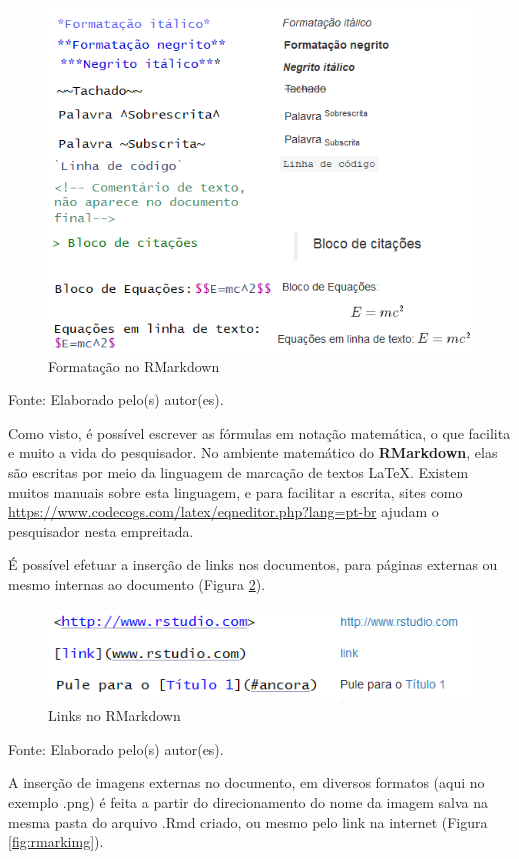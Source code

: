 \documentclass[12pt,brazil,]{book}
\begin{document}
\begin{figure}

{\centering \includegraphics[width=0.6\linewidth]{rmarkform} 

}

\caption{Formatação no RMarkdown}\label{fig:rmarkform}
\end{figure}

Fonte: Elaborado pelo(s) autor(es).

Como visto, é possível escrever as fórmulas em notação matemática, o que
facilita e muito a vida do pesquisador. No ambiente matemático do
\textbf{RMarkdown}, elas são escritas por meio da linguagem de marcação
de textos LaTeX. Existem muitos manuais sobre esta linguagem, e para
facilitar a escrita, sites como
\url{https://www.codecogs.com/latex/eqneditor.php?lang=pt-br} ajudam o
pesquisador nesta empreitada.

É possível efetuar a inserção de links nos documentos, para páginas
externas ou mesmo internas ao documento (Figura \ref{fig:rmarklinks}).

\begin{figure}

{\centering \includegraphics[width=0.6\linewidth]{rmarklinks} 

}

\caption{Links no RMarkdown}\label{fig:rmarklinks}
\end{figure}

Fonte: Elaborado pelo(s) autor(es).

A inserção de imagens externas no documento, em diversos formatos (aqui
no exemplo .png) é feita a partir do direcionamento do nome da imagem
salva na mesma pasta do arquivo .Rmd criado, ou mesmo pelo link na
internet (Figura \ref{fig:rmarkimg}).
\end{document}
